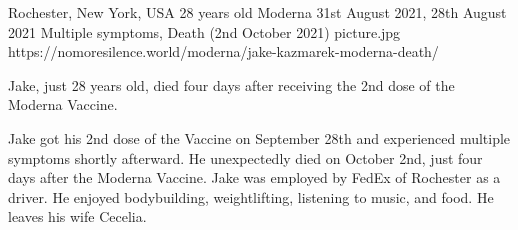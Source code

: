           {Rochester, New York, USA}
          {28 years old}
          {Moderna}
          {31st August 2021, 28th August 2021}
          {Multiple symptoms, Death (2nd October 2021)}
          {picture.jpg}
          {https://nomoresilence.world/moderna/jake-kazmarek-moderna-death/}
          {

Jake, just 28 years old, died four days after receiving the 2nd dose of the
Moderna Vaccine.

Jake got his 2nd dose of the Vaccine on September 28th and experienced multiple
symptoms shortly afterward. He unexpectedly died on October 2nd, just four days
after the Moderna Vaccine. Jake was employed by FedEx of Rochester as a
driver. He enjoyed bodybuilding, weightlifting, listening to music, and food. He
leaves his wife Cecelia.

}
